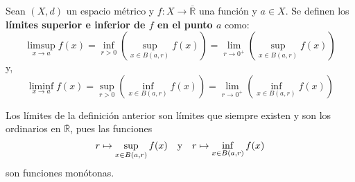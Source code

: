 \documentclass[12pt]{report}
\newcounter{it}
\theoremstyle{largebreak}
\newcommand\cf[3]{\ensuremath{#1:#2\rightarrow#3}}
\begin{document}
    \begin{mydef}
        Sean $(X,d)$ un espacio métrico y $\cf{f}{X}{\overline{\mathbb{R}}}$ una función y $a\in X$. Se definen los \textbf{límites superior e inferior de $f$ en el punto $a$} como:
        \begin{equation*}
            \limsup_{ x\rightarrow a}f(x)=\inf_{r>0}\left(\sup_{ x\in B(a,r)}f(x) \right)=\lim_{ r\rightarrow0^+}\left(\sup_{ x\in B(a,r)}f(x) \right)
        \end{equation*}
        y,
        \begin{equation*}
            \liminf_{ x\rightarrow a}f(x)=\sup_{r>0}\left(\inf_{ x\in B(a,r)}f(x) \right)=\lim_{ r\rightarrow0^+}\left(\inf_{ x\in B(a,r)}f(x) \right)
        \end{equation*}
    \end{mydef}

    \begin{obs}
        Los límites de la definición anterior son límites que siempre existen y son los ordinarios en $\overline{\mathbb{R}}$, pues las funciones
        \begin{equation*}
            r\mapsto\sup_{x\in B(a,r)}f(x)\quad\textup{y}\quad r\mapsto\inf_{x\in B(a,r)}f(x)
        \end{equation*}
        son funciones monótonas.
    \end{obs}
\end{document}
